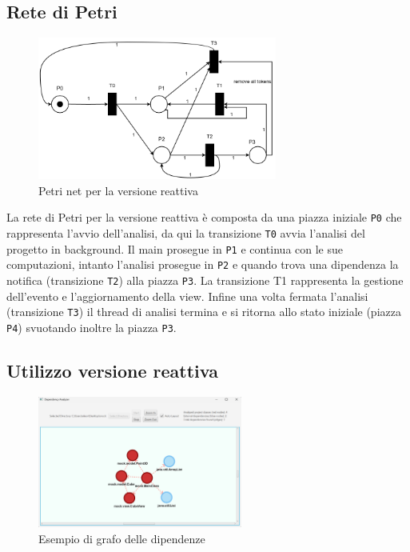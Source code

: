 \documentclass[11pt,notitlepage]{article}
\begin{document}
\subsection{Rete di Petri}

\begin{figure}[H]
    \centering
    \includegraphics[width=0.7\textwidth]{Petri_reactive.png}
    \caption{Petri net per la versione reattiva}
    \label{fig:rete-petri-reattiva}
\end{figure}

La rete di Petri per la versione reattiva è composta da una piazza iniziale \texttt{P0} che rappresenta l'avvio dell'analisi, da qui la transizione \texttt{T0} avvia l'analisi del progetto
in background. Il main prosegue in \texttt{P1} e continua con le sue computazioni, intanto l'analisi prosegue in \texttt{P2} e quando trova una dipendenza la notifica (transizione \texttt{T2})
alla piazza \texttt{P3}. La transizione T1 rappresenta la gestione dell'evento e l'aggiornamento della view. Infine una volta fermata l'analisi (transizione \texttt{T3}) il thread di analisi 
termina e si ritorna allo stato iniziale (piazza \texttt{P4}) svuotando inoltre la piazza \texttt{P3}.

\subsection{Utilizzo versione reattiva}

\begin{figure}[H]
    \centering
    \includegraphics[width=0.6\textwidth]{Dependecies_graph_mock.png}
    \caption{Esempio di grafo delle dipendenze}
    \label{fig:reactive-screenshot}
\end{figure}
\end{document}
